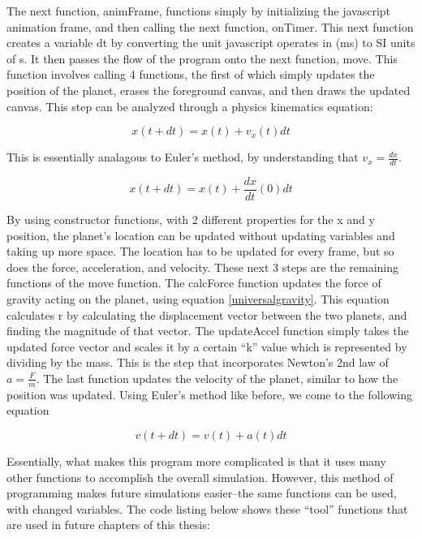 The next function, animFrame, functions simply by initializing the javascript animation frame, and then calling the next function, onTimer.  This next function creates a variable dt by converting the unit javascript operates in (ms) to SI units of s.  It then passes the flow of the program onto the next function, move.  This function involves calling 4 functions, the first of which simply updates the position of the planet, erases the foreground canvas, and then draws the updated canvas.  This step can be analyzed through a physics kinematics equation:

\begin{equation}\label{velo}
x(t+dt) = x(t) + v_x(t)dt
\end{equation}

This is essentially analagous to Euler's method, by understanding that $v_x = \frac{dx}{dt}$.  

\begin{equation}\label{euler}
x(t+dt) = x(t) + \frac{dx}{dt}\left(0\right) dt
\end{equation}

By using constructor functions, with 2 different properties for the x and y position, the planet's location can be updated without updating variables and taking up more space.  The location has to be updated for every frame, but so does the force, acceleration, and velocity.  These next 3 steps are the remaining functions of the move function.  The calcForce function updates the force of gravity acting on the planet, using equation \ref{universalgravity}.  This equation calculates r by calculating the displacement vector between the two planets, and finding the magnitude of that vector.  The updateAccel function simply takes the updated force vector and scales it by a certain ``k'' value which is represented by dividing by the mass.  This is the step that incorporates Newton's 2nd law of $a = \frac{F}{m} $.  The last function updates the velocity of the planet, similar to how the position was updated.  Using Euler's method like before, we come to the following equation

\begin{equation}\label{euleraccel}
 v (t+dt) =  v(t) + a(t)dt 
\end{equation}





Essentially, what makes this program more complicated is that it uses many other functions to accomplish the overall simulation.  However, this method of programming makes future simulations easier--the same functions can be used, with changed variables.  The code listing below shows these ``tool'' functions that are used in future chapters of this thesis:

